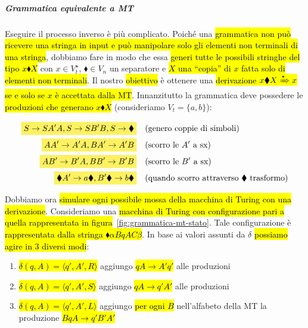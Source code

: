 \documentclass[a4paper,11pt,oneside]{article}
\theoremstyle{plain}
\theoremstyle{definition}
\theoremstyle{remark}
\newcommand{\mhl}[1]{\colorbox{hlcolor}{$\displaystyle #1$}}
\newcommand*{\derivstar}[1][]{\xRightarrow[#1]{\star}}
\newcommand*{\termsep}[0]{\blacklozenge}
\begin{document}
\subparagraph{Grammatica equivalente a MT} Eseguire il processo inverso è più
complicato. Poiché una \hl{grammatica non può ricevere una stringa in input e
può manipolare solo gli elementi non terminali di una stringa}, dobbiamo fare in
modo che essa \hl{generi tutte le possibili stringhe del tipo $x \termsep X$}
con $x \in V_t^\star$, $\termsep \in V_n$ un separatore  e \hl{$X$ una ``copia''
di $x$ fatta solo di elementi non terminali}. Il nostro \hl{obiettivo} è
ottenere una \hl{derivazione $x \termsep X \derivstar x$ se e solo se $x$ è
accettata dalla MT}\@.  Innanzitutto la grammatica deve possedere le
\hl{produzioni che generano $x \termsep X$} (consideriamo $V_t = \{a,b\}$):

\begin{align}
  \mhl{S \to SA'A, S \to SB'B, S \to \termsep} & \quad
    \text{(genero coppie di simboli)}\\
  \mhl{AA' \to A'A, BA' \to A'B} & \quad \text{(scorro le $A'$ a sx)}\\
  \mhl{AB' \to B'A, BB' \to B'B} & \quad \text{(scorro le $B'$ a sx)}\\
  \mhl{\termsep A' \to a\termsep, B'\termsep \to b\termsep} & \quad
    \text{(quando scorro attraverso $\termsep$ trasformo)}
\end{align}

Dobbiamo ora \hl{simulare ogni possibile mossa della macchina di Turing con una
derivazione}. Consideriamo una \hl{macchina di Turing con configurazione pari a
quella rappresentata in figura}~\ref{fig:grammatica-mt-stato}. Tale
configurazione è \hl{rappresentata dalla stringa $\termsep\alpha BqAC\beta$}. In
base ai valori assunti da $\delta$ \hl{possiamo agire in 3 diversi modi}:

\begin{enumerate}
  \item \hl{$\delta(q, A) = \langle q', A', R \rangle$} aggiungo \hl{$qA \to
    A'q'$} alle produzioni
  \item \hl{$\delta(q, A) = \langle q', A', S \rangle$} aggiungo \hl{$qA \to
    q'A'$} alle produzioni
  \item \hl{$\delta(q, A) = \langle q', A', L \rangle$} aggiungo \hl{per ogni
    $B$} nell'alfabeto della MT la produzione \hl{$BqA \to q'B'A'$}
\end{enumerate}
\end{document}
